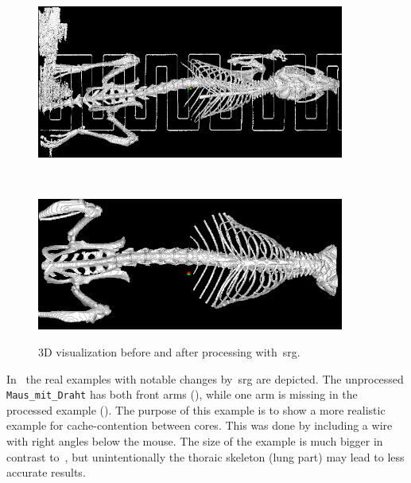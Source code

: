 \documentclass{article}
\begin{document}
\begin{figure}[h!]
\begin{minipage}[t]{0.5\textwidth}
\begin{minipage}[t]{\textwidth}
    \label{fig:skeleton_unproc}
  \end{minipage}%
\end{minipage}%
\begin{minipage}[t]{0.5\textwidth}%
  \centering \vskip 0pt
  \begin{minipage}[t]{\textwidth}%
    \centering \vskip 0pt
    \includegraphics[width=0.9\textwidth]{images/maus_mit_draht_processed.png}
    \label{fig:mausmitdraht_proc}
  \end{minipage}%
  \\
  \begin{minipage}[t]{\textwidth}%
    \centering \vskip 0pt
    \includegraphics[width=0.9\textwidth]{images/skeleton_processed.png}
    \label{fig:skeleton_proc}
  \end{minipage}%
\end{minipage}%
\caption{3D visualization before and after processing with~\ac{srg}.}\label{fig:real2}
\end{figure}

In~ the real examples with notable changes by~\ac{srg} are depicted. 
The unprocessed \texttt{Maus\_mit\_Draht} has both front arms (), while one arm is missing in the processed example ().
The purpose of this example is to show a more realistic example for cache-contention between cores. 
This was done by including a wire with right angles below the mouse. The size of the example is much bigger in contrast to~, but unintentionally the thoraic skeleton (lung part) may lead to less accurate results.
\end{document}
